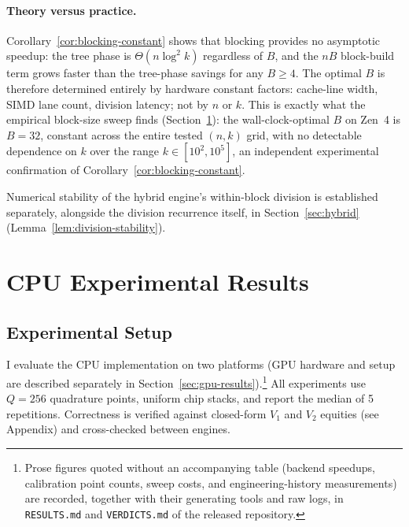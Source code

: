 \documentclass[11pt]{article}
\begin{document}
\paragraph{Theory versus practice.}
Corollary~\ref{cor:blocking-constant} shows that blocking provides no
asymptotic speedup: the tree phase is $\Theta(n\log^2 k)$ regardless of
$B$, and the $nB$ block-build term grows faster than the tree-phase
savings for any $B \ge 4$.  The optimal $B$ is therefore determined
entirely by hardware constant factors: cache-line width, SIMD lane
count, division latency; not by $n$ or $k$.  This is exactly what the
empirical block-size sweep finds (Section~\ref{sec:experiments}): the
wall-clock-optimal $B$ on Zen~4 is $B = 32$, constant across the entire
tested $(n,k)$ grid, with no detectable dependence on $k$ over the range
$k \in [10^2, 10^5]$, an independent experimental confirmation of
Corollary~\ref{cor:blocking-constant}.

Numerical stability of the hybrid engine's within-block division is
established separately, alongside the division recurrence itself, in
Section~\ref{sec:hybrid} (Lemma~\ref{lem:division-stability}).

\section{CPU Experimental Results}\label{sec:experiments}


\subsection{Experimental Setup}

I evaluate the CPU implementation on two platforms (GPU hardware and setup
are described separately in Section~\ref{sec:gpu-results}).\footnote{Prose
figures quoted without an accompanying table (backend speedups,
calibration point counts, sweep costs, and engineering-history
measurements) are recorded, together with their generating tools and raw
logs, in \texttt{RESULTS.md} and \texttt{VERDICTS.md} of the released
repository.}
All experiments
use $Q = 256$ quadrature points, uniform chip stacks, and report the median
of 5 repetitions. Correctness is verified against closed-form $V_1$ and
$V_2$ equities (see Appendix) and cross-checked between engines.
\end{document}
